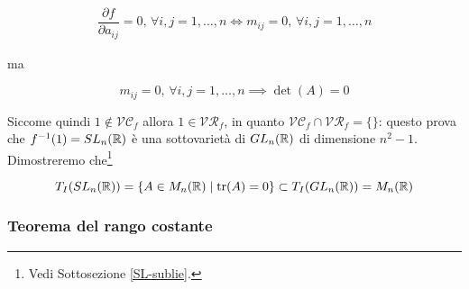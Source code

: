 \begin{align}
	\dfrac{\partial f}{\partial a_{ij}} = 0, \, \forall i,j=1,\dots,n \iff m_{ij} = 0, \, \forall i,j=1,\dots,n
\end{align}

ma

\begin{equation}
	m_{ij} = 0, \, \forall i,j=1,\dots,n \implies \det(A) = 0
\end{equation}

Siccome quindi $ 1 \notin \mathcal{VC}_{f} $ allora $ 1 \in \mathcal{VR}_{f} $, in quanto $ \mathcal{VC}_{f} \cap \mathcal{VR}_{f} = \{\} $: questo prova che $ f^{-1}(1) = SL_{n}(\mathbb{R}) $ è una sottovarietà di $ GL_{n}(\mathbb{R}) $ di dimensione $ n^{2}-1 $.\\
Dimostreremo che\footnote{%
	Vedi Sottosezione \ref{SL-sublie}.}

\begin{equation}
	T_{I}(SL_{n}(\mathbb{R})) = \{ A \in M_{n}(\mathbb{R}) \mid \tr(A)=0 \} \subset T_{I}(GL_{n}(\mathbb{R})) = M_{n}(\mathbb{R})
\end{equation}

\subsubsection{Teorema del rango costante}

